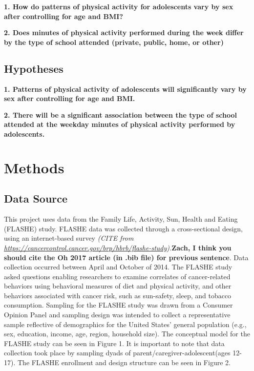 \documentclass[
]{article}
\begin{document}
\textbf{1. How do patterns of physical activity for adolescents vary by
sex after controlling for age and BMI?}

\textbf{2. Does minutes of physical activity performed during the week
differ by the type of school attended (private, public, home, or other)
}

\hypertarget{hypotheses}{%
\subsection{Hypotheses}\label{hypotheses}}

\textbf{1. Patterns of physical activity of adolescents will
significantly vary by sex after controlling for age and BMI.}

\textbf{2. There will be a significant association between the type of
school attended at the weekday minutes of physical activity performed by
adolescents.}

\hypertarget{methods}{%
\section{Methods}\label{methods}}

\hypertarget{data-source}{%
\subsection{Data Source}\label{data-source}}

This project uses data from the Family Life, Activity, Sun, Health and
Eating (FLASHE) study. FLASHE data was collected through a
cross-sectional design, using an internet-based survey \emph{(CITE from
\url{https://cancercontrol.cancer.gov/brp/hbrb/flashe-study}).}\textbf{Zach,
I think you should cite the Oh 2017 article (in .bib file) for previous
sentence}. Data collection occurred between April and October of 2014.
The FLASHE study asked questions enabling researchers to examine
correlates of cancer-related behaviors using behavioral measures of diet
and physical activity, and other behaviors associated with cancer risk,
such as sun-safety, sleep, and tobacco consumption. Sampling for the
FLASHE study was drawn from a Consumer Opinion Panel and sampling design
was intended to collect a representative sample reflective of
demographics for the United States' general population (e.g., sex,
education, income, age, region, household size). The conceptual model
for the FLASHE study can be seen in Figure 1. It is important to note
that data collection took place by sampling dyads of
parent/caregiver-adolescent(ages 12-17). The FLASHE enrollment and
design structure can be seen in Figure 2.
\end{document}
